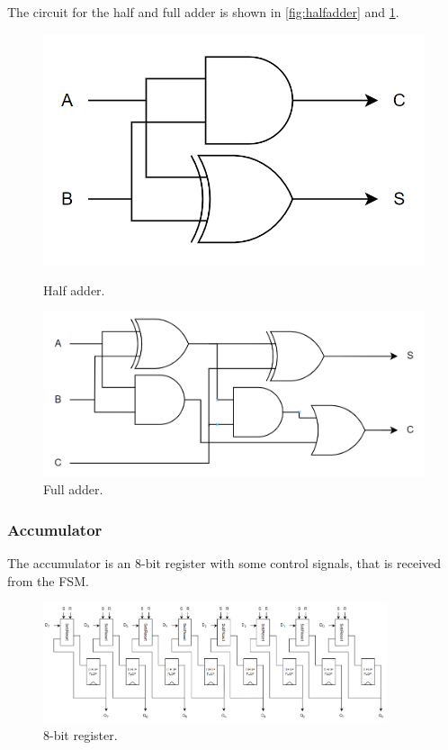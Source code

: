 The circuit for the half and full adder is shown in \autoref{fig:halfadder} and \ref{fig:fulladder}. 

\begin{figure}[H]
\begin{minipage}{0.4\textwidth}
    \centering
    \includegraphics[width=\linewidth]{Figures/halfadder.png}
    \caption{Half adder.}
    \label{fig:halfadder}
\end{minipage}
\begin{minipage}{0.6\textwidth}
    \centering
    \includegraphics[width=\linewidth]{Figures/fulladder.png}
    \caption{Full adder.}
    \label{fig:fulladder}
\end{minipage}
\end{figure}


\subsubsection{Accumulator}
\label{subsubsec:accumulator}
The accumulator is an 8-bit register with some control signals, that is received from the FSM. 

\begin{figure}[H]
    \centering
    \includegraphics[width=0.9\textwidth]{Figures/8bitRegister.png}
    \caption{8-bit register.}
    \label{fig:8bitregister}
\end{figure}

